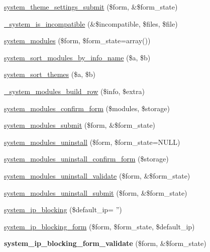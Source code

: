 \begin{DoxyCompactItemize}
\item 
\hyperlink{system_8admin_8inc_a5403622cfdf9642a628637c4b4836c72}{system\_\-theme\_\-settings\_\-submit} (\$form, \&\$form\_\-state)
\item 
\hyperlink{system_8admin_8inc_ad026206dcc488d13c621043f8f6312dd}{\_\-system\_\-is\_\-incompatible} (\&\$incompatible, \$files, \$file)
\item 
\hyperlink{group__forms_gaf4691243ea56e10a971d3d04a94c47b1}{system\_\-modules} (\$form, \$form\_\-state=array())
\item 
\hyperlink{system_8admin_8inc_aff1678b51b0d78a4c27b8e05b4f6621b}{system\_\-sort\_\-modules\_\-by\_\-info\_\-name} (\$a, \$b)
\item 
\hyperlink{system_8admin_8inc_a8770f4f3651607a040ea5e73311ea2bd}{system\_\-sort\_\-themes} (\$a, \$b)
\item 
\hyperlink{system_8admin_8inc_ab84fc74aab734c723053e857b39ac570}{\_\-system\_\-modules\_\-build\_\-row} (\$info, \$extra)
\item 
\hyperlink{group__forms_ga253f61674ab19c32b0df811c365ae00c}{system\_\-modules\_\-confirm\_\-form} (\$modules, \$storage)
\item 
\hyperlink{system_8admin_8inc_ab5e3e0148d76ec1bfe7e441d4ff56146}{system\_\-modules\_\-submit} (\$form, \&\$form\_\-state)
\item 
\hyperlink{group__forms_gadb3d128adf18e3ff4e23ada8271b24c8}{system\_\-modules\_\-uninstall} (\$form, \$form\_\-state=NULL)
\item 
\hyperlink{group__forms_ga3006c568c437410b5fedb4c6d68ddbf4}{system\_\-modules\_\-uninstall\_\-confirm\_\-form} (\$storage)
\item 
\hyperlink{system_8admin_8inc_a043bb0ba8fa3b299202ffee8d63e9fca}{system\_\-modules\_\-uninstall\_\-validate} (\$form, \&\$form\_\-state)
\item 
\hyperlink{system_8admin_8inc_aa4fa94b5401ff21e77b711edf0e196c4}{system\_\-modules\_\-uninstall\_\-submit} (\$form, \&\$form\_\-state)
\item 
\hyperlink{system_8admin_8inc_a68bcf98eaaedb0085bcb2efe025f7d5f}{system\_\-ip\_\-blocking} (\$default\_\-ip= '')
\item 
\hyperlink{group__forms_gac3f2a53aa9b70f6366568d557701d163}{system\_\-ip\_\-blocking\_\-form} (\$form, \$form\_\-state, \$default\_\-ip)
\item 
\hypertarget{system_8admin_8inc_afb175617dfc127adfd6d8354d4c3f56b}{
{\bfseries system\_\-ip\_\-blocking\_\-form\_\-validate} (\$form, \&\$form\_\-state)}
\label{system_8admin_8inc_afb175617dfc127adfd6d8354d4c3f56b}


\end{DoxyCompactItemize}
